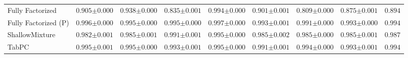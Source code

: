 \begin{tabular}{lrrrrrrr|r}
    \midrule
    Fully Factorized & $0.905${\tiny${\pm 0.000}$} & $0.938${\tiny${\pm 0.000}$} & $0.835${\tiny${\pm 0.001}$} & $0.994${\tiny${\pm 0.000}$} & $0.901${\tiny${\pm 0.001}$} & $0.809${\tiny${\pm 0.000}$} & $0.875${\tiny${\pm 0.001}$} & $0.894$ \\
    Fully Factorized (P) & $0.996${\tiny${\pm 0.000}$} & $0.995${\tiny${\pm 0.000}$} & $0.995${\tiny${\pm 0.000}$} & $0.997${\tiny${\pm 0.000}$} & $0.993${\tiny${\pm 0.001}$} & $0.991${\tiny${\pm 0.000}$} & $0.993${\tiny${\pm 0.000}$} & $0.994$ \\
    ShallowMixture & $0.982${\tiny${\pm 0.001}$} & $0.985${\tiny${\pm 0.001}$} & $0.991${\tiny${\pm 0.001}$} & $0.995${\tiny${\pm 0.000}$} & $0.985${\tiny${\pm 0.002}$} & $0.985${\tiny${\pm 0.000}$} & $0.985${\tiny${\pm 0.001}$} & $0.987$ \\
    TabPC & $0.995${\tiny${\pm 0.001}$} & $0.995${\tiny${\pm 0.000}$} & $0.993${\tiny${\pm 0.001}$} & $0.995${\tiny${\pm 0.000}$} & $0.991${\tiny${\pm 0.001}$} & $0.994${\tiny${\pm 0.000}$} & $0.993${\tiny${\pm 0.001}$} & $0.994$ \\
    \bottomrule[1.0pt]
\end{tabular}
